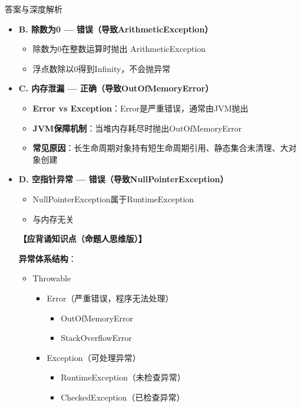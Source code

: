 \documentclass[12pt, a4paper]{ctexart}
\begin{document}
\begin{enumerate}[label=\textbf{\arabic*.}]
\begin{bluebox}{答案与深度解析}
\begin{itemize}[label={}, leftmargin=*, nosep]
		      \item \textbf{B. 除数为0 — 错误（导致ArithmeticException）}
		      \begin{itemize}[label={}, leftmargin=*, nosep]
			      \item 除数为0在整数运算时抛出 ArithmeticException
			      \item 浮点数除以0得到Infinity，不会抛异常
		      \end{itemize}

		      \item \textbf{C. 内存泄漏 — 正确（导致OutOfMemoryError）}
		      \begin{itemize}[label={}, leftmargin=*, nosep]
			      \item \textbf{Error vs Exception}：Error是严重错误，通常由JVM抛出
			      \item \textbf{JVM保障机制}：当堆内存耗尽时抛出OutOfMemoryError
			      \item \textbf{常见原因}：长生命周期对象持有短生命周期引用、静态集合未清理、大对象创建
		      \end{itemize}

		      \item \textbf{D. 空指针异常 — 错误（导致NullPointerException）}
		      \begin{itemize}[label={}, leftmargin=*, nosep]
			      \item NullPointerException属于RuntimeException
			      \item 与内存无关
		      \end{itemize}

		      \textbf{【应背诵知识点（命题人思维版）】}

		      \textbf{异常体系结构}：
		      \begin{itemize}[label={}, leftmargin=*, nosep]
			      \item Throwable
			            \begin{itemize}[label={}, leftmargin=*, nosep]
				            \item Error（严重错误，程序无法处理）
				                  \begin{itemize}[label={}, leftmargin=*, nosep]
					                  \item OutOfMemoryError
					                  \item StackOverflowError
				                  \end{itemize}
				            \item Exception（可处理异常）
				                  \begin{itemize}[label={}, leftmargin=*, nosep]
					                  \item RuntimeException（未检查异常）
					                  \item CheckedException（已检查异常）
				                  \end{itemize}
			            \end{itemize}
		      \end{itemize}


\end{itemize}
\end{bluebox}
\end{enumerate}
\end{document}
